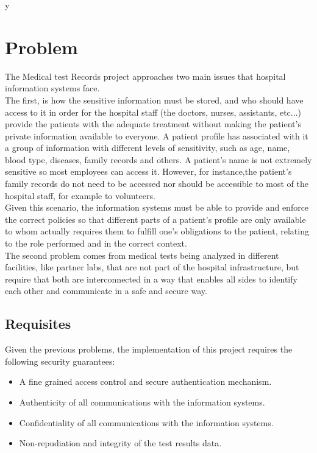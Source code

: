 y\section{Problem}

The Medical test Records project approaches two main issues that hospital information systems face. \\

The first, is how the sensitive information must be stored,  and who should have access to it in order for the hospital staff (the doctors, nurses, assistants, etc...) provide the patients with the adequate treatment without making the patient's private information available to everyone.
A patient profile has associated with it a group of information with different levels of sensitivity, such as age, name, blood type, diseases, family records and others.
A patient's name is not extremely sensitive so most employees can access it. However, for instance,the patient's family records do not need to be accessed nor should be accessible to most of the hospital staff, for example to volunteers. \\

Given this scenario, the information systems  must be able to provide and enforce the correct policies so that different parts of a patient's profile are only available to whom actually requires them to fulfill one's obligations to the patient, relating to the role performed and in the correct context. \\

The second problem comes from medical tests being analyzed in different facilities, like partner labs, that are not part of the hospital infrastructure, but require that both are interconnected in a way that enables all sides to identify each other and communicate in a safe and secure way. \\

\subsection{Requisites}

Given the previous problems, the implementation of this project requires the following security guarantees:
\begin{itemize}
	\item A fine grained access control and secure authentication mechanism.
	\item Authenticity of all communications with the information systems.
	\item Confidentiality of all communications with the information systems.
	\item Non-repudiation and integrity of the test results data.
\end{itemize}

